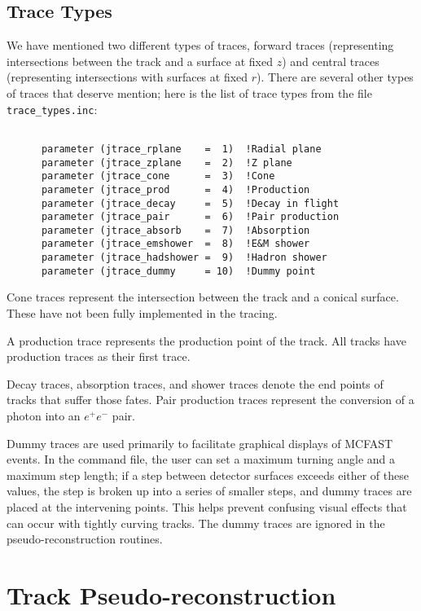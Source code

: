 \subsection{Trace Types}

We have mentioned two different types of traces, forward traces
(representing intersections between the track and a surface at fixed $z$)
and central traces (representing intersections with surfaces at fixed $r$).
There are several other types of traces that deserve mention; here is the
list of trace types from the file \verb'trace_types.inc':

\begin{verbatim}

      parameter (jtrace_rplane    =  1)  !Radial plane
      parameter (jtrace_zplane    =  2)  !Z plane
      parameter (jtrace_cone      =  3)  !Cone
      parameter (jtrace_prod      =  4)  !Production
      parameter (jtrace_decay     =  5)  !Decay in flight
      parameter (jtrace_pair      =  6)  !Pair production
      parameter (jtrace_absorb    =  7)  !Absorption
      parameter (jtrace_emshower  =  8)  !E&M shower
      parameter (jtrace_hadshower =  9)  !Hadron shower
      parameter (jtrace_dummy     = 10)  !Dummy point

\end{verbatim}

Cone traces represent the intersection between the track and a conical
surface.  These have not been fully implemented in the tracing.

A production trace represents the production point of the track.  All
tracks have production traces as their first trace.

Decay traces, absorption traces, and shower traces denote the end points
of tracks that suffer those fates.  Pair production traces represent
the conversion of a photon into an $e^+e^-$ pair.

Dummy traces are used primarily to facilitate graphical displays of MCFAST
events.  In the command file, the user can set a maximum turning angle and
a maximum step length; if a step between detector surfaces exceeds either
of these values, the step is broken up into a series of smaller steps, and
dummy traces are placed at the intervening points.  This helps prevent
confusing visual effects that can occur with tightly curving tracks.  The
dummy traces are ignored in the pseudo-reconstruction routines.

\section{Track Pseudo-reconstruction}

